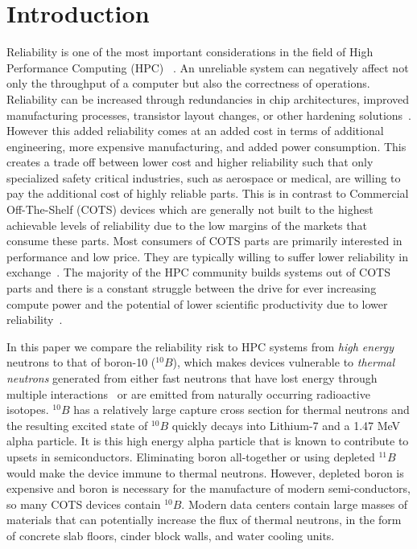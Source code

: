 \section{Introduction}
\label{sec_introduction}

Reliability is one of the most important considerations
in the field of High Performance Computing (HPC) ~\cite{toptenexascale}.
An unreliable system can negatively affect not only the throughput of a computer but also the correctness of operations.
Reliability can be increased through redundancies in chip architectures, improved manufacturing processes, transistor layout changes, or other hardening solutions~\cite{ziegler2004ser}. However this added reliability comes at an added 
cost in terms of additional engineering, more expensive manufacturing, and added power consumption. This creates a trade off
between lower cost and higher reliability such that only specialized safety critical 
industries, such as aerospace or medical, are willing to pay the additional cost of highly
reliable parts.
This is in contrast to Commercial Off-The-Shelf (COTS) devices which are generally not built to the highest achievable levels of reliability due to the low margins of the markets that consume these parts. Most consumers of COTS parts are primarily interested in performance and low price. They are typically willing to suffer lower reliability in exchange~\cite{ziegler2004ser, Baumann2005}.  The majority of the HPC community builds systems out of COTS parts and there is a constant struggle between the   
drive for ever increasing compute power and the potential of lower
 scientific productivity due to lower reliability~\cite{snir2014addressing}.


In this paper we compare the reliability risk to HPC systems from \textit{high energy} neutrons to that of boron-10 ($^{10}B$), which makes devices vulnerable  to \textit{thermal neutrons} generated from either fast neutrons that have lost energy through multiple interactions~\cite{Baumann2005, ziegler2003} or are emitted from naturally occurring radioactive isotopes. $^{10}B$ has a relatively large capture cross section for thermal neutrons and the resulting excited state of $^{10}B$ quickly decays into Lithium-7 and a 1.47 MeV alpha particle. It is this high energy alpha particle that is known to contribute to upsets in semiconductors. Eliminating boron all-together or using depleted $^{11}B$ would make the device immune to thermal neutrons. However, depleted boron is expensive and boron is necessary for the manufacture of modern semi-conductors, so many COTS devices contain $^{10}B$.  Modern data centers contain large masses of materials that can potentially increase the flux of thermal neutrons, in the form of concrete
slab floors, cinder block walls, and water cooling units. %

